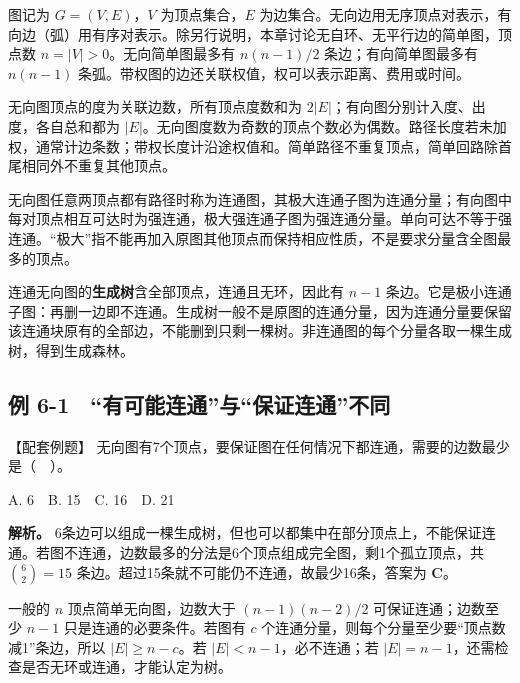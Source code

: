 \begin{definition}[图与本章模型]

图记为 \(G=(V,E)\)，\(V\) 为顶点集合，\(E\) 为边集合。无向边用无序顶点对表示，有向边（弧）用有序对表示。除另行说明，本章讨论无自环、无平行边的简单图，顶点数 \(n=|V|>0\)。无向简单图最多有 \(n(n-1)/2\) 条边；有向简单图最多有 \(n(n-1)\) 条弧。带权图的边还关联权值，权可以表示距离、费用或时间。

\end{definition}

无向图顶点的度为关联边数，所有顶点度数和为 \(2|E|\)；有向图分别计入度、出度，各自总和都为 \(|E|\)。无向图度数为奇数的顶点个数必为偶数。路径长度若未加权，通常计边条数；带权长度计沿途权值和。简单路径不重复顶点，简单回路除首尾相同外不重复其他顶点。

无向图任意两顶点都有路径时称为连通图，其极大连通子图为连通分量；有向图中每对顶点相互可达时为强连通，极大强连通子图为强连通分量。单向可达不等于强连通。``极大''指不能再加入原图其他顶点而保持相应性质，不是要求分量含全图最多的顶点。

连通无向图的\textbf{生成树}含全部顶点，连通且无环，因此有 \(n-1\) 条边。它是极小连通子图：再删一边即不连通。生成树一般不是原图的连通分量，因为连通分量要保留该连通块原有的全部边，不能删到只剩一棵树。非连通图的每个分量各取一棵生成树，得到生成森林。

\subsection{例 6-1　``有可能连通''与``保证连通''不同}\label{DS06-ex1}

\begin{example}[配套案例]

【配套例题】 无向图有7个顶点，要保证图在任何情况下都连通，需要的边数最少是（　）。

A. 6　B. 15　C. 16　D. 21

\end{example}

\textbf{解析。} 6条边可以组成一棵生成树，但也可以都集中在部分顶点上，不能保证连通。若图不连通，边数最多的分法是6个顶点组成完全图，剩1个孤立顶点，共 \(\binom62=15\) 条边。超过15条就不可能仍不连通，故最少16条，答案为 \textbf{C}。

一般的 \(n\) 顶点简单无向图，边数大于 \((n-1)(n-2)/2\) 可保证连通；边数至少 \(n-1\) 只是连通的必要条件。若图有 \(c\) 个连通分量，则每个分量至少要``顶点数减1''条边，所以 \(|E|\ge n-c\)。若 \(|E|<n-1\)，必不连通；若 \(|E|=n-1\)，还需检查是否无环或连通，才能认定为树。

